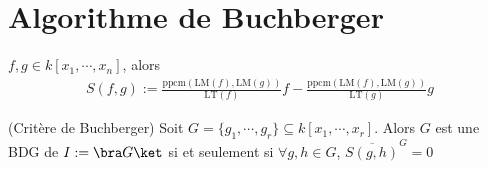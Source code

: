    \section{Algorithme de Buchberger}
        \begin{defi}
            $f,g \in k[x_1, \cdots, x_n]$, alors
            \begin{align*}
                S(f,g) := \frac{\mathrm{ppcm} (\mathrm{LM}(f), \mathrm{LM}(g))}{\mathrm{LT}(f)}f - \frac{\mathrm{ppcm} (\mathrm{LM}(f), \mathrm{LM}(g))}{\mathrm{LT}(g)}g
            \end{align*}
        \end{defi}
        \begin{theo} (Critère de Buchberger)
            Soit $G = \{g_1, \cdots, g_r\} \subseteq k[x_1, \cdots, x_r]$. Alors $G$ est une BDG de $I := \bra G \ket$ si et seulement si $\forall g,h \in G$, $\overline{S(g,h)}^G = 0$
        \end{theo}
